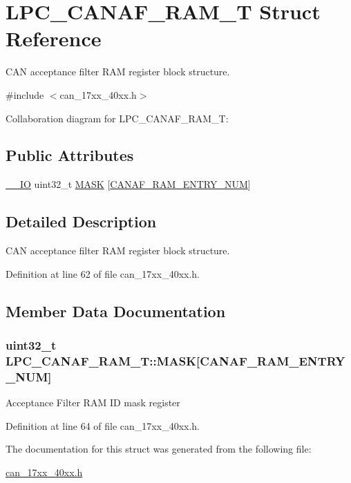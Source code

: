 \hypertarget{structLPC__CANAF__RAM__T}{}\section{L\+P\+C\+\_\+\+C\+A\+N\+A\+F\+\_\+\+R\+A\+M\+\_\+T Struct Reference}
\label{structLPC__CANAF__RAM__T}


C\+AN acceptance filter R\+AM register block structure.  




{\ttfamily \#include $<$can\+\_\+17xx\+\_\+40xx.\+h$>$}



Collaboration diagram for L\+P\+C\+\_\+\+C\+A\+N\+A\+F\+\_\+\+R\+A\+M\+\_\+T\+:
\subsection*{Public Attributes}
\begin{DoxyCompactItemize}
\item 
\hyperlink{core__cm3_8h_aec43007d9998a0a0e01faede4133d6be}{\+\_\+\+\_\+\+IO} uint32\+\_\+t \hyperlink{structLPC__CANAF__RAM__T_aca1f20422319eb6c80082ba9fd8cc3bc}{M\+A\+SK} \mbox{[}\hyperlink{group__CAN__17XX__40XX_ga79546dad61d5645789e339371e9f491f}{C\+A\+N\+A\+F\+\_\+\+R\+A\+M\+\_\+\+E\+N\+T\+R\+Y\+\_\+\+N\+UM}\mbox{]}
\end{DoxyCompactItemize}


\subsection{Detailed Description}
C\+AN acceptance filter R\+AM register block structure. 

Definition at line 62 of file can\+\_\+17xx\+\_\+40xx.\+h.



\subsection{Member Data Documentation}
\subsubsection[{\texorpdfstring{M\+A\+SK}{MASK}}]{ uint32\+\_\+t L\+P\+C\+\_\+\+C\+A\+N\+A\+F\+\_\+\+R\+A\+M\+\_\+\+T\+::\+M\+A\+SK\mbox{[}{\bf C\+A\+N\+A\+F\+\_\+\+R\+A\+M\+\_\+\+E\+N\+T\+R\+Y\+\_\+\+N\+UM}\mbox{]}}\hypertarget{structLPC__CANAF__RAM__T_aca1f20422319eb6c80082ba9fd8cc3bc}{}\label{structLPC__CANAF__RAM__T_aca1f20422319eb6c80082ba9fd8cc3bc}
Acceptance Filter R\+AM ID mask register 

Definition at line 64 of file can\+\_\+17xx\+\_\+40xx.\+h.



The documentation for this struct was generated from the following file\+:\begin{DoxyCompactItemize}
\item 
\hyperlink{can__17xx__40xx_8h}{can\+\_\+17xx\+\_\+40xx.\+h}\end{DoxyCompactItemize}
